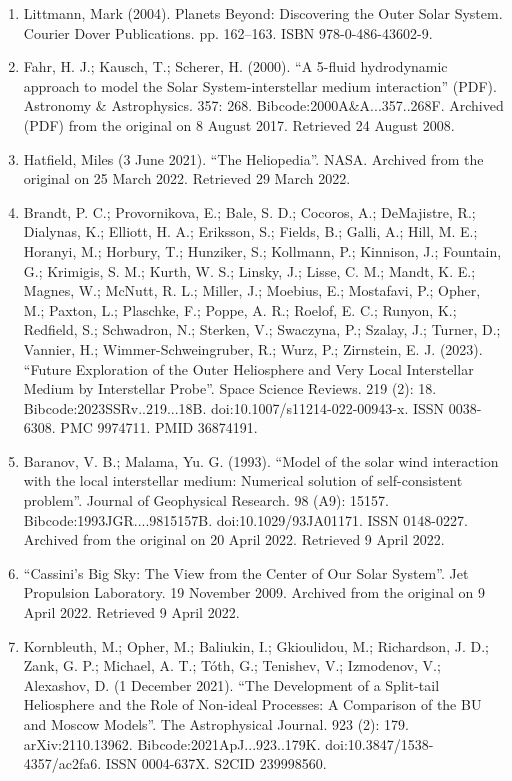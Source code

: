 \begin{enumerate}
\item Littmann, Mark (2004). Planets Beyond: Discovering the Outer Solar System. Courier Dover Publications. pp. 162–163. ISBN 978-0-486-43602-9.
\item Fahr, H. J.; Kausch, T.; Scherer, H. (2000). ``A 5-fluid hydrodynamic approach to model the Solar System-interstellar medium interaction'' (PDF). Astronomy \& Astrophysics. 357: 268. Bibcode:2000A\&A...357..268F. Archived (PDF) from the original on 8 August 2017. Retrieved 24 August 2008.
\item Hatfield, Miles (3 June 2021). ``The Heliopedia''. NASA. Archived from the original on 25 March 2022. Retrieved 29 March 2022.
\item Brandt, P. C.; Provornikova, E.; Bale, S. D.; Cocoros, A.; DeMajistre, R.; Dialynas, K.; Elliott, H. A.; Eriksson, S.; Fields, B.; Galli, A.; Hill, M. E.; Horanyi, M.; Horbury, T.; Hunziker, S.; Kollmann, P.; Kinnison, J.; Fountain, G.; Krimigis, S. M.; Kurth, W. S.; Linsky, J.; Lisse, C. M.; Mandt, K. E.; Magnes, W.; McNutt, R. L.; Miller, J.; Moebius, E.; Mostafavi, P.; Opher, M.; Paxton, L.; Plaschke, F.; Poppe, A. R.; Roelof, E. C.; Runyon, K.; Redfield, S.; Schwadron, N.; Sterken, V.; Swaczyna, P.; Szalay, J.; Turner, D.; Vannier, H.; Wimmer-Schweingruber, R.; Wurz, P.; Zirnstein, E. J. (2023). ``Future Exploration of the Outer Heliosphere and Very Local Interstellar Medium by Interstellar Probe''. Space Science Reviews. 219 (2): 18. Bibcode:2023SSRv..219...18B. doi:10.1007/s11214-022-00943-x. ISSN 0038-6308. PMC 9974711. PMID 36874191.
\item Baranov, V. B.; Malama, Yu. G. (1993). ``Model of the solar wind interaction with the local interstellar medium: Numerical solution of self-consistent problem''. Journal of Geophysical Research. 98 (A9): 15157. Bibcode:1993JGR....9815157B. doi:10.1029/93JA01171. ISSN 0148-0227. Archived from the original on 20 April 2022. Retrieved 9 April 2022.
\item ``Cassini's Big Sky: The View from the Center of Our Solar System''. Jet Propulsion Laboratory. 19 November 2009. Archived from the original on 9 April 2022. Retrieved 9 April 2022.
\item Kornbleuth, M.; Opher, M.; Baliukin, I.; Gkioulidou, M.; Richardson, J. D.; Zank, G. P.; Michael, A. T.; Tóth, G.; Tenishev, V.; Izmodenov, V.; Alexashov, D. (1 December 2021). ``The Development of a Split-tail Heliosphere and the Role of Non-ideal Processes: A Comparison of the BU and Moscow Models''. The Astrophysical Journal. 923 (2): 179. arXiv:2110.13962. Bibcode:2021ApJ...923..179K. doi:10.3847/1538-4357/ac2fa6. ISSN 0004-637X. S2CID 239998560.

\end{enumerate}
